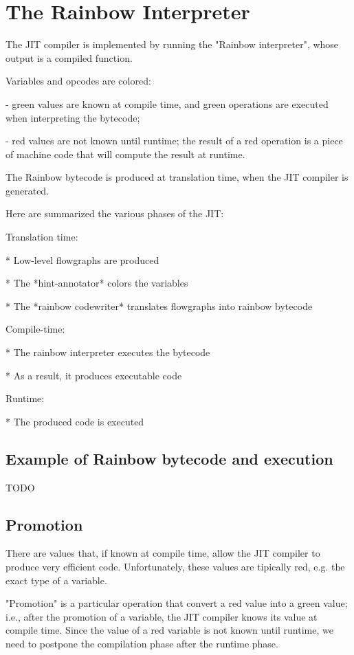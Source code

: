 \section{The Rainbow Interpreter}

The JIT compiler is implemented by running the "Rainbow interpreter", whose
output is a compiled function.

Variables and opcodes are colored:

  - green values are known at compile time, and green operations are executed
    when interpreting the bytecode;

  - red values are not known until runtime; the result of a red operation is a
    piece of machine code that will compute the result at runtime.

The Rainbow bytecode is produced at translation time, when the JIT compiler is
generated.

Here are summarized the various phases of the JIT:

Translation time:

  * Low-level flowgraphs are produced

  * The *hint-annotator* colors the variables

  * The *rainbow codewriter* translates flowgraphs into rainbow bytecode


Compile-time:

  * The rainbow interpreter executes the bytecode

  * As a result, it produces executable code

Runtime:

  * The produced code is executed


\subsection{Example of Rainbow bytecode and execution}

TODO

\subsection{Promotion}

There are values that, if known at compile time, allow the JIT compiler to
produce very efficient code.  Unfortunately, these values are tipically red,
e.g. the exact type of a variable.

"Promotion" is a particular operation that convert a red value into a green
value; i.e., after the promotion of a variable, the JIT compiler knows its
value at compile time. Since the value of a red variable is not known until
runtime, we need to postpone the compilation phase after the runtime phase.

